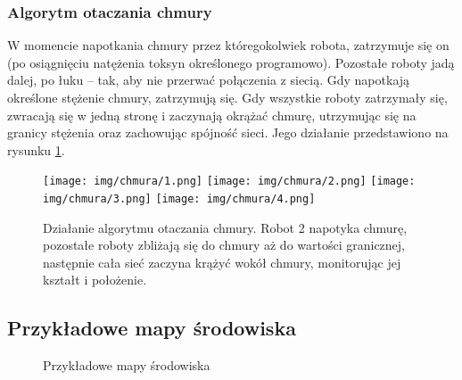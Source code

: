 \documentclass[a4paper, 12pt]{article}
\begin{document}
	\subsubsection{Algorytm otaczania chmury}
	W momencie napotkania chmury przez któregokolwiek robota, zatrzymuje się on (po osiągnięciu natężenia toksyn określonego programowo). Pozostałe roboty jadą dalej, po łuku -- tak, aby nie przerwać połączenia z siecią. Gdy napotkają określone stężenie chmury, zatrzymują się. Gdy wszystkie roboty zatrzymały się, zwracają się w jedną stronę i zaczynają okrążać chmurę, utrzymując się na granicy stężenia oraz zachowując spójność sieci. Jego działanie przedstawiono na rysunku \ref{otaczanie}.
	\begin{figure}[h!]
		\texttt{[image: img/chmura/1.png]}
		\texttt{[image: img/chmura/2.png]}
		\texttt{[image: img/chmura/3.png]}
		\texttt{[image: img/chmura/4.png]}
		\caption{Działanie algorytmu otaczania chmury. Robot 2 napotyka chmurę, pozostałe roboty zbliżają się do chmury aż do wartości granicznej, następnie cała sieć zaczyna krążyć wokół chmury, monitorując jej kształt i położenie.}
		\label{otaczanie}
	\end{figure}
	\clearpage
	\subsection{Przykładowe mapy środowiska}
	\begin{figure}[h!]
		\centering
		\caption{Przykładowe mapy środowiska}
	\end{figure}
\end{document}
